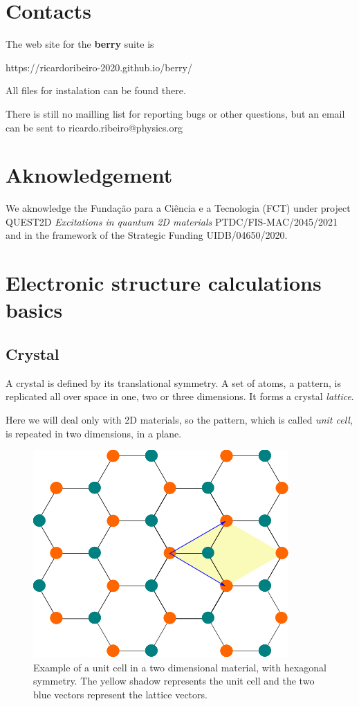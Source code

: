 \documentclass[a4paper,12pt]{report}
\begin{document}
\section{Contacts}

The web site for the \textbf{berry} suite is\medskip

https://ricardoribeiro-2020.github.io/berry/\medskip

All files for instalation can be found there.

There is still no mailling list for reporting bugs or other questions, but an email can be sent to
ricardo.ribeiro@physics.org

\section{Aknowledgement}

We aknowledge the Fundação para a Ciência e a Tecnologia (FCT)
under project  QUEST2D \emph{Excitations in quantum 2D materials}
PTDC/FIS-MAC/2045/2021 and in the framework of the Strategic Funding UIDB/04650/2020.

\section{Electronic structure calculations basics}

\subsection*{Crystal}
A crystal is defined by its translational symmetry.
A set of atoms, a pattern, is replicated all over space in one, two or three dimensions.
It forms a crystal \emph{lattice}.

Here we will deal only with 2D materials, so the pattern, which is called \emph{unit cell},
is repeated in two dimensions, in a plane.

\begin{figure}
 \centering
 \includegraphics[scale=0.5,keepaspectratio=true]{figures/unitcell_honeycomb.png}
 \caption{Example of a unit cell in a two dimensional material, with hexagonal symmetry.
 The yellow shadow represents the unit cell and the two blue vectors represent the lattice vectors.}
 \label{fig:unitcell}
\end{figure}
\end{document}
